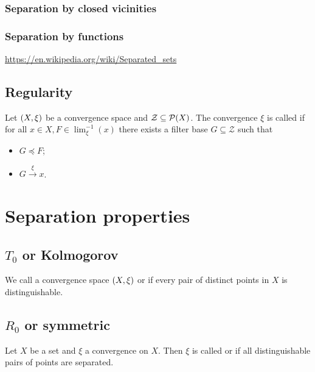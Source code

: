 \subsubsection{Separation by closed vicinities}
\subsubsection{Separation by functions}
\url{https://en.wikipedia.org/wiki/Separated_sets}

\subsection{Regularity}
\begin{definition}
Let $\left( X,\xi \right)$ be a convergence space and $\mathcal{Z} \subseteq \operatorname{\mathcal{P}}(X)$. The convergence $\xi$ is called  if for all $x\in X, F\in\lim_\xi^{-1}(x)$ there exists a filter base $G\subseteq \mathcal{Z}$ such that
\begin{itemize}
\item $G \preceq F$;
\item $G \overset{\xi}{\longrightarrow} x$.
\end{itemize}
\end{definition}

\section{Separation properties}
\subsection{$T_0$ or Kolmogorov}
\begin{definition}
We call a convergence space $\left( X, \xi \right)$  or  if every pair of distinct points in $X$ is distinguishable.
\end{definition}

\subsection{$R_0$ or symmetric}
\begin{definition}
Let $X$ be a set and $\xi$ a convergence on $X$. Then $\xi$ is called  or  if all distinguishable pairs of points are separated.
\end{definition}

